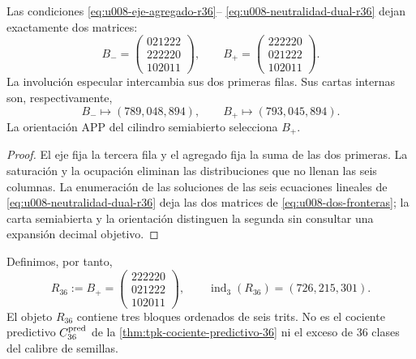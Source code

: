 \begin{proposition}
\label{prop:u008-enumeracion-r36}
Las condiciones \eqref{eq:u008-eje-agregado-r36}--
\eqref{eq:u008-neutralidad-dual-r36} dejan exactamente dos matrices:
\begin{equation}
 B_-=
 \begin{pmatrix}021222\\222220\\102011\end{pmatrix},
 \qquad
 B_+=
 \begin{pmatrix}222220\\021222\\102011\end{pmatrix}.
 \label{eq:u008-dos-fronteras}
\end{equation}
La involución especular intercambia sus dos primeras filas. Sus cartas
internas son, respectivamente,
\begin{equation}
 B_-\longmapsto(789,048,894),
 \qquad
 B_+\longmapsto(793,045,894).
 \label{eq:u008-cartas-frontera}
\end{equation}
La orientación APP del cilindro semiabierto selecciona \(B_+\).
\end{proposition}

\begin{proof}
El eje fija la tercera fila y el agregado fija la suma de las dos primeras.
La saturación y la ocupación eliminan las distribuciones que no llenan las
seis columnas. La enumeración de las soluciones de las seis ecuaciones
lineales de \eqref{eq:u008-neutralidad-dual-r36} deja las dos matrices de
\eqref{eq:u008-dos-fronteras}; la carta semiabierta y la orientación
distinguen la segunda sin consultar una expansión decimal objetivo.
\end{proof}

Definimos, por tanto,
\begin{equation}
 R_{36}:=B_+=
 \begin{pmatrix}
 222220\\
 021222\\
 102011
 \end{pmatrix},
 \qquad
 \operatorname{ind}_3(R_{36})=(726,215,301).
 \label{eq:u008-r36-construida}
\end{equation}
El objeto \(R_{36}\) contiene tres bloques ordenados de seis trits. No es el
cociente predictivo \(C_{36}^{\rm pred}\) de la
\cref{thm:tpk-cociente-predictivo-36} ni el exceso de 36 clases del calibre
de semillas.

